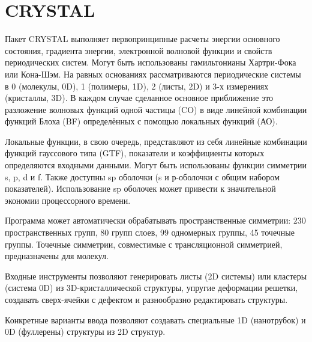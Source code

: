 \section{CRYSTAL}
Пакет CRYSTAL выполняет первопринципные расчеты энергии основного состояния, градиента энергии, электронной волновой функции и свойств периодических систем. Могут быть использованы гамильтонианы Хартри-Фока или Кона-Шэм. На равных основаниях рассматриваются периодические системы в 0 (молекулы, 0D), 1 (полимеры, 1D), 2 (листы, 2D) и 3-х измерениях (кристаллы, 3D). В каждом случае сделанное основное приближение это разложение волновых функций одной частицы (CO) в виде линейной комбинации функций Блоха (BF) определённых с помощью локальных функций (АО).

Локальные функции, в свою очередь, представляют из себя линейные комбинации функций гауссового типа (GTF), показатели и коэффициенты которых определяются входными данными. Могут быть использованы функции симметрии s, p, d и f. Также доступны sp оболочки (s и р-оболочки с общим набором показателей). Использование sp оболочек может привести к значительной экономии процессорного времени.

Программа может автоматически обрабатывать пространственные симметрии: 230 пространственных групп, 80 групп слоев, 99 одномерных группы, 45 точечные группы. Точечные симметрии, совместимые с трансляционной симметрией, предназначены для молекул.

Входные инструменты позволяют генерировать листы (2D системы) или кластеры (система 0D) из 3D-кристаллической структуры, упругие деформации решетки, создавать сверх-ячейки с дефектом и разнообразно редактировать структуры.

Конкретные варианты ввода позволяют создавать специальные 1D (нанотрубок) и 0D (фуллерены) структуры из 2D структур.